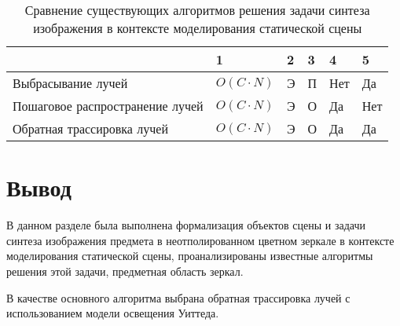 \begin{table}[hbtp]
	\begin{center}
		\begin{flushleft}
			\caption{\label{tab:compare}Сравнение существующих алгоритмов решения задачи синтеза изображения в контексте моделирования статической сцены}
		\end{flushleft}
		\begin{tabular}{|l | l | l | l | l | l |} 
			\hline 
			~					& {1} & {2} & {3} & {4} & {5} \\ \hline
			Выбрасывание лучей & \texttt{$O(C \cdot N)$} & Э & П  & Нет & Да \\ \hline
			Пошаговое распространение лучей & \texttt{$O(C \cdot N)$} & Э & О & Да & Нет \\ \hline
			Обратная трассировка лучей & \texttt{$O(C \cdot N)$} & Э & О & Да & Да \\ \hline
		\end{tabular}
	\end{center}
\end{table}

\section*{Вывод}

В данном разделе была выполнена формализация объектов сцены и задачи синтеза изображения предмета в неотполированном цветном зеркале в контексте моделирования статической сцены, проанализированы известные алгоритмы решения этой задачи, предметная область зеркал.

В качестве основного алгоритма выбрана обратная трассировка лучей с использованием модели освещения Уиттеда.